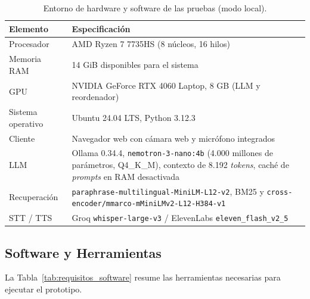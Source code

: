 \begin{table}[H]
  \caption{Entorno de hardware y software de las pruebas (modo local).}
  \label{tab:hardware}
  \centering
  \renewcommand{\arraystretch}{1.2}
  \begin{tabular}{|p{4cm}|p{9cm}|}
    \hline
    \rowcolor[HTML]{EFEFEF}
    \textbf{Elemento} & \textbf{Especificación} \\ \hline
    Procesador & AMD Ryzen 7 7735HS (8 núcleos, 16 hilos) \\ \hline
    Memoria RAM & 14 GiB disponibles para el sistema \\ \hline
    GPU & NVIDIA GeForce RTX 4060 Laptop, 8 GB (LLM y reordenador) \\ \hline
    Sistema operativo & Ubuntu 24.04 LTS, Python 3.12.3 \\ \hline
    Cliente & Navegador web con cámara web y micrófono integrados \\ \hline
    LLM & Ollama 0.34.4, \texttt{nemotron-\allowbreak{}3-\allowbreak{}nano:4b} (4.000 millones de parámetros, Q4\_K\_M), contexto de 8.192 \textit{tokens}, caché de \textit{prompts} en RAM desactivada \\ \hline
    Recuperación & \texttt{paraphrase-\allowbreak{}multilingual-\allowbreak{}MiniLM-\allowbreak{}L12-\allowbreak{}v2}, BM25 y \texttt{cross-\allowbreak{}encoder/\allowbreak{}mmarco-\allowbreak{}mMiniLMv2-\allowbreak{}L12-\allowbreak{}H384-\allowbreak{}v1} \\ \hline
    STT / TTS & Groq \texttt{whisper-\allowbreak{}large-\allowbreak{}v3} / ElevenLabs \texttt{eleven\_\allowbreak{}flash\_\allowbreak{}v2\_5} \\ \hline
  \end{tabular}
  \elaboradopor{\autorTFG}
\end{table}

\subsection{Software y Herramientas}
La Tabla~\ref{tab:requisitos_software} resume las herramientas necesarias para ejecutar el prototipo.

